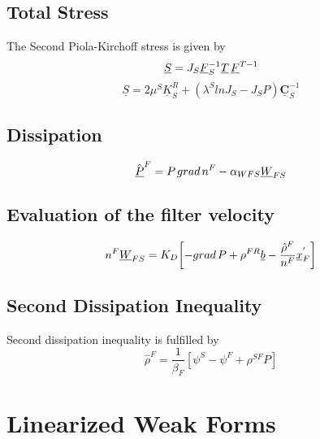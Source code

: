 \documentclass[12pt]{article}
\begin{document}
\subsection{Total Stress}
The Second Piola-Kirchoff stress is given by 
\begin{equation*}
	\underline{S} = {{J}_S}{\underline{F}_{S}^{-1}}{\underline{T}}\hspace{0.5mm}
	{\underline{F}^{T-1}}
\end{equation*}
\begin{equation}
	\boxed{\underline{S} = {{2}{\mu^S}{\underline{K}_{S}^{R}}} + {({\lambda^S}ln{{J}_{S}}-{{J}_{S}}{P})}{\underline{\mathbf{C}}_{S}^{-1}}}
\end{equation}
\subsection{Dissipation}
\begin{equation}
	\hat{\underline{P}}^{F} = {P \hspace{0.5mm}grad\hspace{0.5mm}n^F} - {{\alpha}_{WFS}}{\underline{W}_{FS}}   
\end{equation}

\subsection{Evaluation of the filter velocity }
\begin{equation}
	{n^F}{\underline{W}_{FS}} = {K_{D}}{\left[{-grad\hspace{0.5mm}P}+{\rho^{FR}}{\underline{b}}-{{\frac{\hat{\rho}^F}{n^F}}{\underline{x}_{F}^{'}}}\right]}
\end{equation}
\subsection{Second Dissipation Inequality}
Second dissipation inequality is fulfilled by 
\begin{equation}
	\hat{\rho}^F = {\frac{1}{\beta_{F}}}\left[{{\psi^S}-{\psi^F}+{\rho^{SF}}{P}}\right]
\end{equation}

\section{Linearized Weak Forms}
\end{document}

